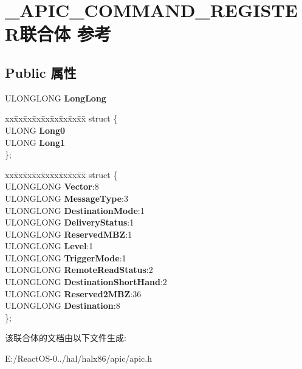 \hypertarget{union___a_p_i_c___c_o_m_m_a_n_d___r_e_g_i_s_t_e_r}{}\section{\+\_\+\+A\+P\+I\+C\+\_\+\+C\+O\+M\+M\+A\+N\+D\+\_\+\+R\+E\+G\+I\+S\+T\+E\+R联合体 参考}
\label{union___a_p_i_c___c_o_m_m_a_n_d___r_e_g_i_s_t_e_r}
\subsection*{Public 属性}
\begin{DoxyCompactItemize}
\item 
\mbox{\label{union___a_p_i_c___c_o_m_m_a_n_d___r_e_g_i_s_t_e_r_a4424a07f43eb8511c62916d26e53c080}} 
U\+L\+O\+N\+G\+L\+O\+NG {\bfseries Long\+Long}
\item 
\mbox{\label{union___a_p_i_c___c_o_m_m_a_n_d___r_e_g_i_s_t_e_r_acc36b992ed72ad5149a44f6790701088}} 
\begin{tabbing}
xx\=xx\=xx\=xx\=xx\=xx\=xx\=xx\=xx\=\kill
struct \{\\
\>ULONG {\bfseries Long0}\\
\>ULONG {\bfseries Long1}\\
\}; \\

\end{tabbing}\item 
\mbox{\label{union___a_p_i_c___c_o_m_m_a_n_d___r_e_g_i_s_t_e_r_a454da90c66baac6e659bd386f858dd16}} 
\begin{tabbing}
xx\=xx\=xx\=xx\=xx\=xx\=xx\=xx\=xx\=\kill
struct \{\\
\>ULONGLONG {\bfseries Vector}:8\\
\>ULONGLONG {\bfseries MessageType}:3\\
\>ULONGLONG {\bfseries DestinationMode}:1\\
\>ULONGLONG {\bfseries DeliveryStatus}:1\\
\>ULONGLONG {\bfseries ReservedMBZ}:1\\
\>ULONGLONG {\bfseries Level}:1\\
\>ULONGLONG {\bfseries TriggerMode}:1\\
\>ULONGLONG {\bfseries RemoteReadStatus}:2\\
\>ULONGLONG {\bfseries DestinationShortHand}:2\\
\>ULONGLONG {\bfseries Reserved2MBZ}:36\\
\>ULONGLONG {\bfseries Destination}:8\\
\}; \\

\end{tabbing}\end{DoxyCompactItemize}


该联合体的文档由以下文件生成\+:\begin{DoxyCompactItemize}
\item 
E\+:/\+React\+O\+S-\/0../hal/halx86/apic/apic.\+h\end{DoxyCompactItemize}
